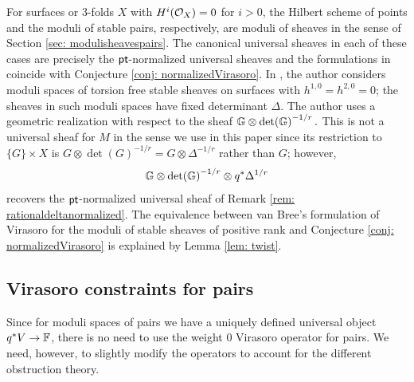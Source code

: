 \documentclass[a4paper, 12pt]{amsart}
\begin{document}
\begin{remark}\label{rem: normalizedpt}
For surfaces or 3-folds $X$ with $H^i({\mathcal O}_X)=0$ for $i>0$, the Hilbert scheme of points and the moduli of stable pairs, respectively, are moduli of sheaves in the sense of Section \ref{sec: modulisheavespairs}. The canonical universal sheaves in each of these cases are precisely the ${\mathsf{pt}}$-normalized universal sheaves and the formulations in \cite{moop, moreira} coincide with Conjecture \ref{conj: normalizedVirasoro}. In \cite{bree}, the author considers moduli spaces of torsion free stable sheaves on surfaces with $h^{1,0}=h^{2,0}=0$; the sheaves in such moduli spaces have fixed determinant $\Delta$. The author uses a geometric realization with respect to the sheaf
${\mathbb{G}}\otimes \det({\mathbb{G}})^{-1/r}\,.$
This is not a universal sheaf for $M$ in the sense we use in this paper since its restriction to $\{G\}\times X$ is $G\otimes \det(G)^{-1/r}=G\otimes \Delta^{-1/r}$ rather than $G$; however,
\[{\mathbb{G}}\otimes \det({\mathbb{G}})^{-1/r}\otimes q^\ast\Delta^{1/r}\]
recovers the ${\mathsf{pt}}$-normalized universal sheaf of Remark \ref{rem: rationaldeltanormalized}. The equivalence between van Bree's formulation of Virasoro for the moduli of stable sheaves of positive rank and Conjecture \ref{conj: normalizedVirasoro} is explained by Lemma \ref{lem: twist}.
\end{remark}

\subsection{Virasoro constraints for pairs}
\label{sec: virasoropairs}

Since for moduli spaces of pairs we have a uniquely defined universal object $q^\ast V\to {\mathbb{F}}$, there is no need to use the weight 0 Virasoro operator for pairs. We need, however, to slightly modify the operators to account for the different obstruction theory.
\end{document}
